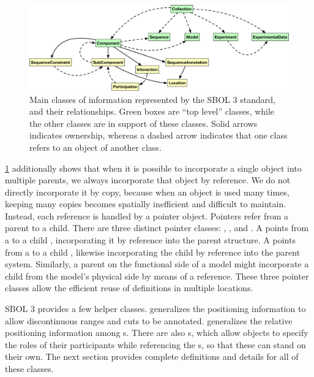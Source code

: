 \begin{figure}[ht]
\begin{center}
\includegraphics[scale=0.85]{images/datamodel.pdf}
\caption{Main classes of information represented by the SBOL 3 standard, and their relationships.  Green boxes are ``top level'' classes, while the other classes are in support of these classes. Solid arrows indicates ownership, whereas a dashed arrow indicates that one class refers to an object of another class.}
\label{images:overview2}
\end{center}
\end{figure}

\ref{images:overview2} additionally shows that when it is possible to incorporate a single object into multiple parents, we always incorporate that object by reference. We do not directly incorporate it by copy, because when an object is used many times, keeping many copies becomes spatially inefficient and difficult to maintain. Instead, each reference is handled by a pointer object. 
Pointers refer from a parent to a child. There are three distinct pointer classes: , , and . A  points from a  to a child , incorporating it by reference into the parent structure. A  points from a  to a child , likewise incorporating the child by reference into the parent system. Similarly, a parent  on the functional side of a model might incorporate a child  from the model's physical side by means of a  reference. These three pointer classes allow the efficient reuse of definitions in multiple locations.

SBOL 3 provides a few helper classes.   generalizes the positioning information to allow discontinuous ranges and cuts to be annotated.   generalizes the relative positioning information among s.  
There are also s, which allow  objects to specify the roles of their participants while referencing the s, so that these can stand on their own.
The next section provides complete definitions and details for all of these classes.

